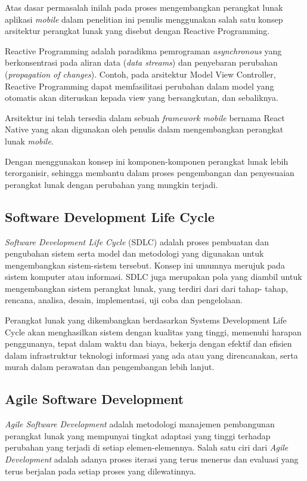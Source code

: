 \begin{spacing}{2}
    Atas dasar permasalah inilah pada proses mengembangkan perangkat lunak aplikasi \emph{mobile} dalam penelitian ini penulis menggunakan salah satu konsep arsitektur perangkat lunak yang disebut dengan Reactive Programming.

    Reactive Programming adalah paradikma pemrograman \emph{asynchronous} yang berkonsentrasi pada aliran data (\emph{data streams}) dan penyebaran perubahan (\emph{propagation of changes}). Contoh, pada arsitektur Model View Controller, Reactive Programming dapat memfasilitasi perubahan dalam model yang otomatis akan diteruskan kepada view yang bersangkutan, dan sebaliknya.

    Arsitektur ini telah tersedia dalam sebuah \emph{framework mobile} bernama React Native yang akan digunakan oleh penulis dalam mengembangkan perangkat lunak \emph{mobile}.

    Dengan menggunakan konsep ini komponen-komponen perangkat lunak lebih terorganisir, sehingga membantu dalam proses pengembangan dan penyesuaian perangkat lunak dengan perubahan yang mungkin terjadi.

  \subsection{Software Development Life Cycle}
    \emph{Software Development Life Cycle} (SDLC) adalah proses pembuatan dan pengubahan sistem serta model dan metodologi yang digunakan untuk mengembangkan sistem-sistem tersebut. Konsep ini umumnya merujuk pada sistem komputer atau informasi. SDLC juga merupakan pola yang diambil untuk mengembangkan sistem perangkat lunak, yang terdiri dari dari tahap- tahap, rencana, analisa, desain, implementasi, uji coba dan pengelolaan.

    Perangkat lunak yang dikembangkan berdasarkan Systems Development Life Cycle akan menghasilkan sistem dengan kualitas yang tinggi, memenuhi harapan penggunanya, tepat dalam waktu dan biaya, bekerja dengan efektif dan efisien dalam infrastruktur teknologi informasi yang ada atau yang direncanakan, serta murah dalam perawatan dan pengembangan lebih lanjut.

  \subsection{Agile Software Development}
    \emph{Agile Software Development} adalah metodologi manajemen pembangunan perangkat lunak yang mempunyai tingkat adaptasi yang tinggi terhadap perubahan yang terjadi di setiap elemen-elemennya. Salah satu ciri dari \emph{Agile Development} adalah adanya proses iterasi yang terus menerus dan evaluasi yang terus berjalan pada setiap proses yang dilewatinnya.


\end{spacing}
